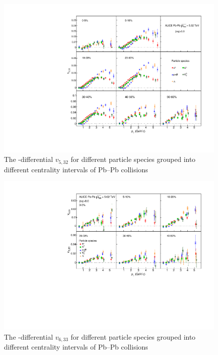 \begin{figure}[!htb]
\begin{center}
\includegraphics[scale=0.82]{figures/results/All_v523_gap00_PID2_3by3.pdf}

\end{center}
\caption{The \pT-differential $v_{5,32}$ for different particle species grouped into different centrality intervals of Pb--Pb collisions \sNN}
\label{v523_particleDependence}
\end{figure}

\begin{figure}[!htb]
\begin{center}
\includegraphics[scale=0.82]{figures/results/All_v633_gap00_PID2_3by2.pdf}

\end{center}
\caption{The \pT-differential $v_{6,33}$ for different particle species grouped into different centrality intervals of Pb--Pb collisions \sNN}
\label{v633_particleDependence}
\end{figure}

